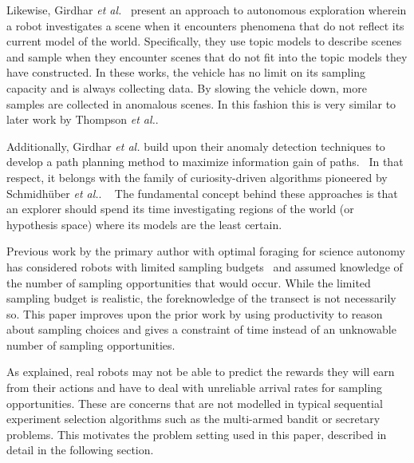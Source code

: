 Likewise, Girdhar \emph{et al.}~\cite{girdhar2013autonomous} present an approach to autonomous exploration wherein a robot
investigates a scene when it encounters phenomena that do not reflect its
current model of the world.  Specifically, they use topic models to describe
scenes and sample when they encounter scenes that do not fit into the topic models
they have constructed.  In these works, the vehicle has no limit on its sampling
capacity and is always collecting data.  By slowing the vehicle down, more
samples are collected in anomalous scenes.  In this fashion this is very
similar to later work by Thompson \emph{et al.}.~\cite{thompson2013adaptive}

Additionally, Girdhar \emph{et al.} build upon their anomaly detection techniques to develop a path planning method to maximize
information gain of paths.~\cite{girdhar2014curiosity}  In that respect, it
belongs with the family of curiosity-driven algorithms pioneered by
Schmidh{\"u}ber \emph{et al.}. 
~\cite{sun2011planning}  The fundamental concept behind these approaches is
that an explorer should spend its time investigating regions of the world (or
hypothesis space) where its models are the least certain.


Previous work by the primary author with optimal foraging for science autonomy has considered robots with limited sampling budgets~\cite{furlong2014budgeting} and assumed knowledge of the number of sampling opportunities that would occur.  While the limited sampling budget is realistic, the foreknowledge of the transect is not necessarily so.  This paper improves upon the prior work by using productivity to reason about sampling choices and gives a constraint of time instead of an unknowable number of sampling opportunities.


As explained, real robots may not be able to predict the rewards they will earn from their actions and have to deal with unreliable arrival rates for sampling opportunities.  These are concerns that are not modelled in typical sequential experiment selection algorithms such as the multi-armed bandit or secretary problems.  This motivates the problem setting used in this paper, described in detail in the following section.

